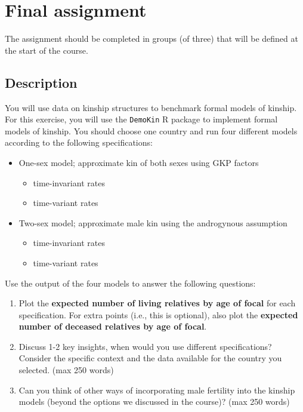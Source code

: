 ﻿\documentclass{article}
\begin{document}
\section{Final assignment}
\label{sec:assignment}

The assignment should be completed in groups (of three) that will be defined at the start of the course.

\subsection{Description}

You will use data on kinship structures to benchmark formal models of kinship.
For this exercise, you will use the \texttt{DemoKin} R package to implement formal models of kinship. 
You should choose one country and run four different models according to the following specifications:

    \begin{itemize}
        \item One-sex model; approximate kin of both sexes using GKP factors
       \begin{itemize}
           \item time-invariant rates
           \item time-variant rates
       \end{itemize}  
        
        \item Two-sex model; approximate male kin using the androgynous assumption
         \begin{itemize}
           \item time-invariant rates
           \item time-variant rates
             \end{itemize}  
     \end{itemize}

    Use the output of the four models to answer the following questions:

    \begin{enumerate}
     
    \item Plot the \textbf{expected number of living relatives by age of focal} for each specification. For extra points (i.e., this is optional), also plot the \textbf{expected number of deceased relatives by age of focal}.
    \item Discuss 1-2 key insights, when would you use different specifications? Consider the specific context and the data available for the country you selected. (max 250 words)
    \item Can you think of other ways of incorporating male fertility into the kinship models (beyond the options we discussed in the course)?  (max 250 words)
       \end{enumerate}  
\end{document}
